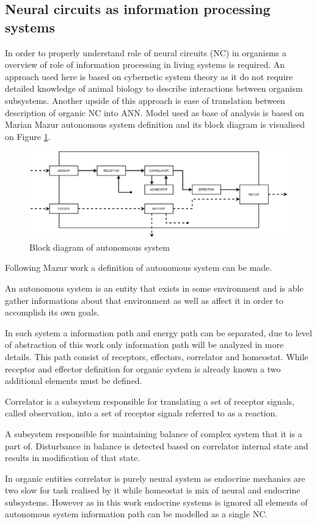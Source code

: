 \subsection{Neural circuits as information processing systems}
In order to properly understand role of neural circuits (NC) in organisms a overview of role
of information processing in living systems is required. An approach used here is based on 
cybernetic system theory \cite{Wiener2011} as it do not require detailed knowledge of animal
biology to describe interactions between organism subsystems. Another upside of this approach is 
ease of translation between description of organic NC into ANN.
Model used as base of analysis is based on Marian Mazur autonomous system definition 
\cite{Mazur1966} and its block diagram is visualised on Figure \ref{fig:auto_system}. 
\begin{figure}[htb] 
	\centering
	\includegraphics[width=\textwidth]{figures/auto_system}
	\caption{Block diagram of autonomous system}
	\label{fig:auto_system}
\end{figure}
Following Mazur work a definition of autonomous system can be made.
\begin{definition}
	An autonomous system is an entity that exists in some environment and is able gather 
	informations about that environment as well as affect it in order to accomplish its own
	goals.
\end{definition}
In such system a information path and energy path can be separated, due to level of abstraction
of this work only information path will be analyzed in more details. This path consist of 
receptors, effectors, correlator and homeostat.  While receptor and effector definition for 
organic system is already known a two additional elements must be defined.
\begin{definition}[Correlator]
	Correlator is a subsystem responsible for translating a set of receptor signals, called
	observation, into a set of receptor signals referred to as a reaction.
\end{definition}
\begin{definition}[Homeostat]
	A subsystem responsible for maintaining balance of complex system that it is a part of.
	Disturbance in balance is detected based on correlator internal state and results in 
	modification of that state.
\end{definition}
In organic entities correlator is purely neural system as endocrine mechanics are two slow for
task realised by it while homeostat is mix of neural and endocrine subsystems. 
However as in this work endocrine systems is ignored all elements of autonomous system 
information path can be modelled as a single NC. 

